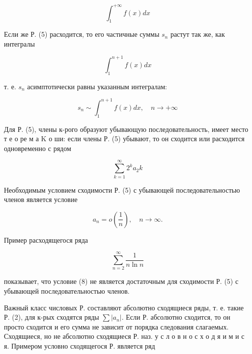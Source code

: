\documentclass[10pt]{article}
\begin{document}
\[

\int_{1}^{+\infty} f(x) d x

\]



Если же Р. (5) расходится, то его частичные суммы $s_{n}$ растут так же, как интегралы



\[

\int_{1}^{n+1} f(x) d x

\]



т. е. $s_{n}$ асимптотически равны указанным интегралам:



\[

s_{n} \sim \int_{1}^{n+1} f(x) d x, \quad n \longrightarrow+\infty

\]



Для Р. (5), члены к-рого образуют убывающую последовательность, имеет место т е о ре м а $\mathrm{K}$ о ши: если члены Р. (5) убывают, то он сходится или расходится одновременно с рядом



\[

\sum_{k=1}^{\infty} 2^{k} a_{2} k

\]



Необходимым условием сходимости Р. (5) с убывающей последовательностью членов является условие



\[

a_{n}=o\left(\frac{1}{n}\right), \quad n \rightarrow \infty .

\]



Пример расходящегося ряда



\[

\sum_{n=2}^{\infty} \frac{1}{n \ln n}

\]



показывает, что условие (8) не является достаточным для сходимости Р. (5) с убывающей последовательностью членов.



Важный класс числовых Р. составляют абсолютно сходящиеся ряды, т. е. такие Р. (2), для к-рых сходятся ряды $\sum\left|a_{n}\right|$. Если Р. абсолютно сходится, то он просто сходится и его сумма не зависит от порядка следования слагаемых. Сходящиеся, но не абсолютно сходящиеся Р. наз. у с л о в н о с х о д я и м и с я. Примером условно сходящегося Р. является ряд
\end{document}
